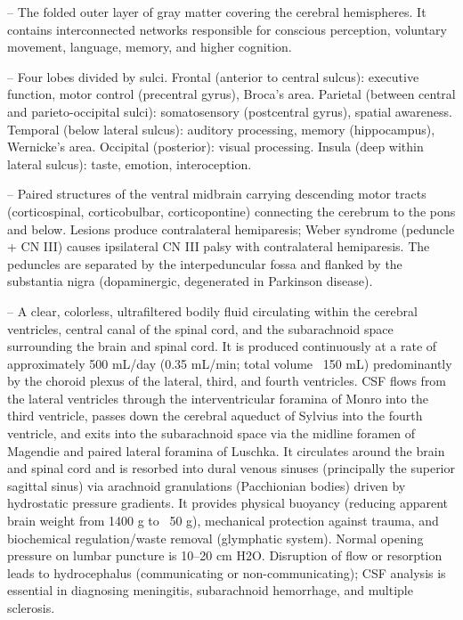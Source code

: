 -- The folded outer layer of gray matter covering the cerebral hemispheres. It contains interconnected networks responsible for conscious perception, voluntary movement, language, memory, and higher cognition.

-- Four lobes divided by sulci. Frontal (anterior to central sulcus): executive function, motor control (precentral gyrus), Broca's area. Parietal (between central and parieto-occipital sulci): somatosensory (postcentral gyrus), spatial awareness. Temporal (below lateral sulcus): auditory processing, memory (hippocampus), Wernicke's area. Occipital (posterior): visual processing. Insula (deep within lateral sulcus): taste, emotion, interoception.

-- Paired structures of the ventral midbrain carrying descending motor tracts (corticospinal, corticobulbar, corticopontine) connecting the cerebrum to the pons and below. Lesions produce contralateral hemiparesis; Weber syndrome (peduncle + CN III) causes ipsilateral CN III palsy with contralateral hemiparesis. The peduncles are separated by the interpeduncular fossa and flanked by the substantia nigra (dopaminergic, degenerated in Parkinson disease).

-- A clear, colorless, ultrafiltered bodily fluid circulating within the cerebral ventricles, central canal of the spinal cord, and the subarachnoid space surrounding the brain and spinal cord. It is produced continuously at a rate of approximately 500 mL/day (0.35 mL/min; total volume ~150 mL) predominantly by the choroid plexus of the lateral, third, and fourth ventricles. CSF flows from the lateral ventricles through the interventricular foramina of Monro into the third ventricle, passes down the cerebral aqueduct of Sylvius into the fourth ventricle, and exits into the subarachnoid space via the midline foramen of Magendie and paired lateral foramina of Luschka. It circulates around the brain and spinal cord and is resorbed into dural venous sinuses (principally the superior sagittal sinus) via arachnoid granulations (Pacchionian bodies) driven by hydrostatic pressure gradients. It provides physical buoyancy (reducing apparent brain weight from 1400 g to ~50 g), mechanical protection against trauma, and biochemical regulation/waste removal (glymphatic system). Normal opening pressure on lumbar puncture is 10--20 cm H2O. Disruption of flow or resorption leads to hydrocephalus (communicating or non-communicating); CSF analysis is essential in diagnosing meningitis, subarachnoid hemorrhage, and multiple sclerosis.


